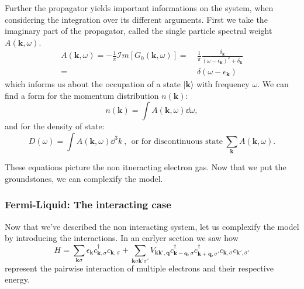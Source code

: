 \documentclass[../main.tex]{subfile}
\begin{document}
Further the propagator yields important informations on the system, when considering the integration over its different arguments. First we take the imaginary 
part of the propagator, called the single particle spectral weight $A(\bm{k}, \omega)$.
\begin{equation}
    \begin{aligned}\label{eq:SingleParticleSpectralWeight}
        A(\bm{k}, \omega) = -\frac{1}{\pi} \mathcal{I}m \left[G_0(\bm{k}, \omega)\right] =~& \frac{1}{\pi} \frac{\delta_{\bm{k}}}{(\omega- \epsilon_{\bm{k}})^2 + \delta_{\bm{k}}}\\
        =~&\delta(\omega- \epsilon_{\bm{k}})
    \end{aligned}
\end{equation}
which informs us about the occupation of a state $|\bm{k}\rangle$ with frequency $\omega$. We can find a form for the momentum distribution $n(\bm{k})$:
\begin{equation}
    n(\bm{k}) = \int A(\bm{k},\omega) \dd \omega,\label{eq:MomentumDistribution}
\end{equation}
and for the density of state:
\begin{equation}\label{eq:DensityOfState}
    D(\omega) = \int A(\bm{k},\omega) \dd ^3 k~,~~ \text{or for discontinuous state}~ \sum_{\bm{k}} A(\bm{k}, \omega).
\end{equation}

These equations picture the non itneracting electron gas. Now that we put the groundstones, we can complexify the model.

\subsubsection{Fermi-Liquid: The interacting case}
Now that we've described the non interacting system, let us complexify the model by introducing the interactions.
In an earlyer section we saw how
\begin{equation} \label{eq:FermiLiquid_Hamiltonian}
    H = \sum_{\bm{k}\sigma} \epsilon_{\bm{k}} c_{\bm{k},\sigma}^{\dagger}c_{\bm{k},\sigma} + \sum_{\bm{k}\sigma\bm{k}'\sigma'}
        V_{\bm{k}\bm{k}', \bm{q}} c_{\bm{k}-\bm{q},\sigma}^{\dagger}c_{\bm{k}+\bm{q},\sigma'}^{\dagger}c_{\bm{k},\sigma}c_{\bm{k}',\sigma'}
\end{equation}
represent the pairwise interaction of multiple electrons and their respective energy.\\
\end{document}

